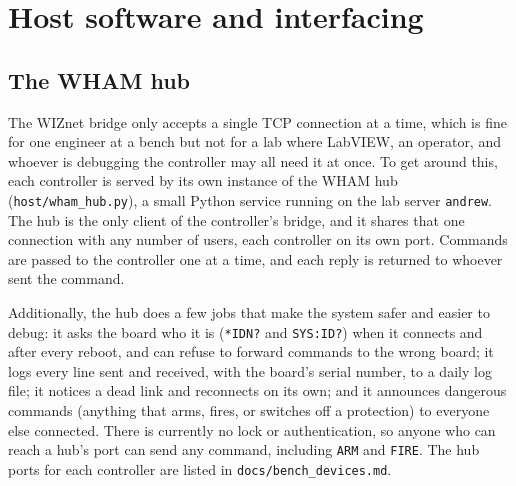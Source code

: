 \documentclass[11pt]{article}
\begin{document}
\section{Host software and interfacing}
\label{sec:host}
\subsection{The WHAM hub}
\label{sec:hub}
The WIZnet bridge only accepts a single TCP connection at a time, which is fine for one engineer at a bench but not for a lab where LabVIEW, an operator, and whoever is debugging the controller may all need it at once. To get around this, each controller is served by its own instance of the WHAM hub (\texttt{host/wham\_hub.py}), a small Python service running on the lab server \texttt{andrew}. The hub is the only client of the controller's bridge, and it shares that one connection with any number of users, each controller on its own port. Commands are passed to the controller one at a time, and each reply is returned to whoever sent the command. 

Additionally, the hub does a few jobs that make the system safer and easier to debug: it asks the board who it is (\texttt{*IDN?} and \texttt{SYS:ID?}) when it connects and after every reboot, and can refuse to forward commands to the wrong board; it logs every line sent and received, with the board's serial number, to a daily log file; it notices a dead link and reconnects on its own; and it announces dangerous commands (anything that arms, fires, or switches off a protection) to everyone else connected. There is currently no lock or authentication, so anyone who can reach a hub's port can send any command, including \texttt{ARM} and \texttt{FIRE}. The hub ports for each controller are listed in \texttt{docs/bench\_devices.md}.
\end{document}
